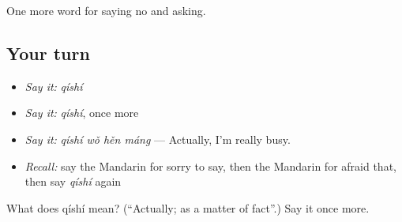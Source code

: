 \begin{grammarlens}[title={What you've built}]
One more word for saying no and asking.
\end{grammarlens}

\subsection*{Your turn}
\begin{itemize}
\raggedright
  \item \emph{Say it:} \emph{qíshí}
  \item \emph{Say it:} \emph{qíshí}, once more
  \item \emph{Say it:} \emph{qíshí wǒ hěn máng} — Actually, I'm really busy.
  \item \emph{Recall:} say the Mandarin for sorry to say, then the Mandarin for afraid that, then say \emph{qíshí} again
\end{itemize}

\begin{tcolorbox}[breakable,colback=teal!4,colframe=teal!35!black,title={Before you move on}]
What does qíshí mean? (\textquotedblleft{}Actually; as a matter of fact\textquotedblright{}.) Say it once more.
\end{tcolorbox}
